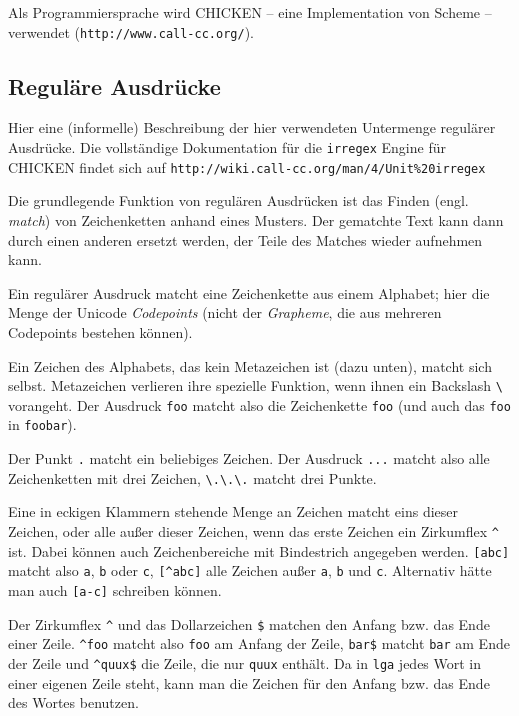 \documentclass[12pt,a4paper,normalheadings]{scrartcl}
\def\bel#1{\textit{#1}}
\begin{document}
Als Programmiersprache wird CHICKEN -- eine Implementation von Scheme --
verwendet (\texttt{http://www.call-cc.org/}).

\subsection{Reguläre Ausdrücke}

Hier eine (informelle)
Beschreibung der hier verwendeten Untermenge regulärer Ausdrücke.
Die vollständige Dokumentation für die \texttt{irregex} Engine für
CHICKEN findet sich auf
\texttt{http://wiki.call-cc.org/man/4/Unit\%20irregex}

Die grundlegende Funktion von regulären Ausdrücken ist das
Finden (engl. \bel{match}) von Zeichenketten anhand eines Musters.
Der gematchte Text kann dann durch einen anderen ersetzt werden,
der Teile des Matches wieder aufnehmen kann.

Ein regulärer Ausdruck matcht eine Zeichenkette aus einem Alphabet;
hier die Menge der Unicode \emph{Codepoints} (nicht
der \emph{Grapheme}, die aus mehreren Codepoints bestehen können).

Ein Zeichen des Alphabets, das kein Metazeichen ist (dazu unten),
matcht sich selbst.
Metazeichen verlieren ihre spezielle Funktion,
wenn ihnen ein Backslash \texttt{\textbackslash} vorangeht.
Der Ausdruck \texttt{foo} matcht also die Zeichenkette \texttt{foo}
(und auch das \texttt{foo} in \texttt{foobar}).

Der Punkt \texttt{.} matcht ein beliebiges Zeichen.
Der Ausdruck \texttt{...} matcht also alle Zeichenketten mit drei Zeichen,
\texttt{\textbackslash.\textbackslash.\textbackslash.} matcht drei Punkte.

Eine in eckigen Klammern stehende Menge an Zeichen matcht eins dieser Zeichen,
oder alle außer dieser Zeichen,
wenn das erste Zeichen ein Zirkumflex \texttt{\^{}} ist.
Dabei können auch Zeichenbereiche mit Bindestrich angegeben werden.
\texttt{[abc]} matcht also \texttt{a}, \texttt{b} oder \texttt{c},
\texttt{[\^{}abc]} alle Zeichen außer \texttt{a}, \texttt{b} und \texttt{c}.
Alternativ hätte man auch \texttt{[a-c]} schreiben können.

Der Zirkumflex \texttt{\^{}} und das Dollarzeichen \texttt{\$}
matchen den Anfang bzw. das Ende einer Zeile.
\texttt{\^{}foo} matcht also \texttt{foo} am Anfang der Zeile,
\texttt{bar\$} matcht \texttt{bar} am Ende der Zeile
und \texttt{\^{}quux\$} die Zeile, die nur \texttt{quux} enthält.
Da in \texttt{lga} jedes Wort in einer eigenen Zeile steht,
kann man die Zeichen für den Anfang bzw. das Ende des Wortes benutzen.
\end{document}
